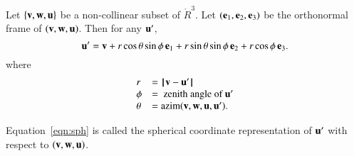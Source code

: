 \begin{lemma}\label{lemma:sph}
Let $\{{\mathbf v},{\mathbf w},{\mathbf u}\}$ %
be a non-collinear subset of $\ring{R}^3$.
Let $({\mathbf e}_1,{\mathbf e}_2,{\mathbf e}_3)$ be the orthonormal frame of $({\mathbf v},{\mathbf w},{\mathbf u})$.
  Then for any ${\mathbf u}'$,
   \begin{equation}
   {\mathbf u}' = {\mathbf v} + r \cos\theta \sin\phi\, {\mathbf e}_1 + r \sin\theta\sin\phi\, {\mathbf e}_2 +
   r\cos\phi\,{\mathbf e}_3.
   \label{eqn:sph}
   \end{equation}
where
$$
\begin{array}{lll}
r &= {\hskip0.1em|\hskip-0.15em|\hskip0.1em}{\mathbf v}  -  {\mathbf u}'{\hskip0.1em|\hskip-0.15em|\hskip0.1em}\\
\phi &= \text{ zenith angle of } {\mathbf u}'\\
\theta &={\operatorname{azim}}({\mathbf v},{\mathbf w},{\mathbf u},{\mathbf u}').
\end{array}
$$
\end{lemma}
%
%
%
%
%
%

\begin{definition}\label{def:sph}
Equation~\ref{eqn:sph} is called the spherical coordinate representation of
${\mathbf u}'$ with respect to $({\mathbf v},{\mathbf w},{\mathbf u})$.   
\end{definition}
%
%
%
%

